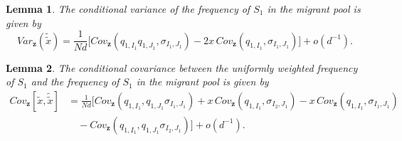 \documentclass[11pt]{article}
\newtheorem{lemma}{Lemma}
\begin{document}


\begin{lemma}\label{lemma4}
The conditional variance of the frequency of $S_1$ in the migrant pool is given by
\begin{equation}\label{sec2-eq23}
Var_{\mathbf{z}}(\tilde{\tilde{x}})=\frac{1}{Nd}\Big[
Cov_{\mathbf{z}}(q_{1,I_1}q_{1,J_1},\sigma_{I_1,J_1})-2x\,Cov_{\mathbf{z}}(q_{1,I_1},\sigma_{I_1,J_1})
\Big]+o(d^{-1}).
\end{equation}
\end{lemma}



\begin{lemma}\label{lemma5}
The conditional covariance between the uniformly weighted frequency of $S_1$ and the frequency of $S_1$ in the migrant pool is given by
\begin{align}\label{sec2-eq25}
Cov_{\mathbf{z}}\left[\tilde{x},\tilde{\tilde{x}}\right]&=\frac{1}{Nd}\Big[
Cov_{\mathbf{z}}(q_{1,I_1},q_{1,J_1}\sigma_{I_1,J_1})
+x\,Cov_{\mathbf{z}}(q_{1,I_1},\sigma_{I_2,J_1})
-x\,Cov_{\mathbf{z}}(q_{1,I_1},\sigma_{I_1,J_1})\nonumber\\
&\quad
-Cov_{\mathbf{z}}(q_{1,I_1},q_{1,J_1}\sigma_{I_2,J_1})
\Big]+o(d^{-1}).
\end{align}
\end{lemma}



\end{document}
